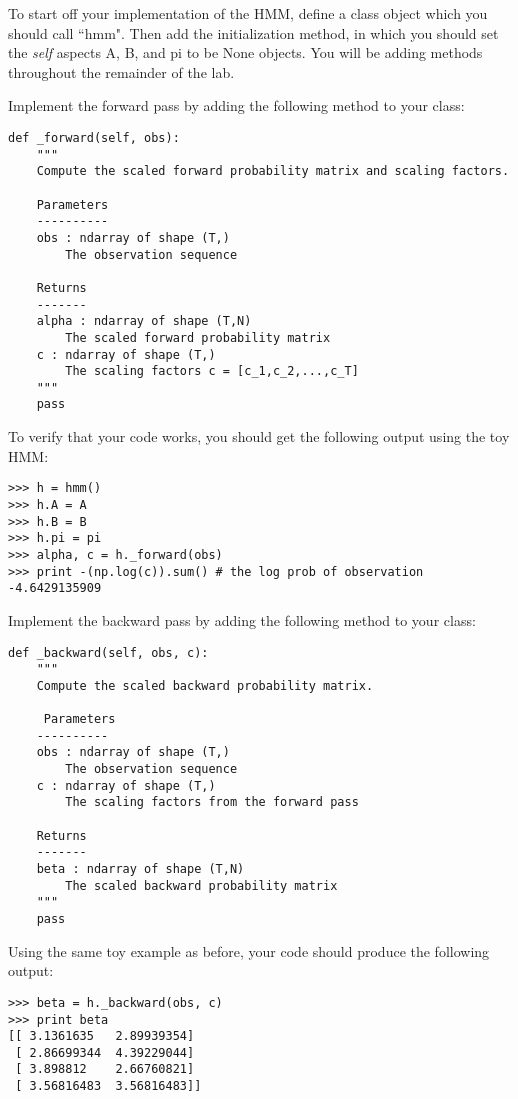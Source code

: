 
\begin{comment}
The following was listed as a problem, but gave the student nothing to do, so we removed the given code.

To start off your implementation of the HMM, define a class using the following code.
You will be adding class methods throughout the remainder of the lab.
\begin{lstlisting}
class hmm(object):
    """
    Finite state space hidden markov model.
    """
    def __init__(self):
        """
        Initialize model parameters.
        """
        self.A = None
        self.B = None
        self.pi = None
\end{lstlisting}
\end{comment}
To start off your implementation of the HMM, define a class object which you should call ``hmm".
Then add the initialization method, in which you should set the \emph{self} aspects A, B, and pi to be None objects.
You will be adding methods throughout the remainder of the lab.

Implement the forward pass by adding the following method to your class:
\begin{lstlisting}
def _forward(self, obs):
    """
    Compute the scaled forward probability matrix and scaling factors.

    Parameters
    ----------
    obs : ndarray of shape (T,)
        The observation sequence

    Returns
    -------
    alpha : ndarray of shape (T,N)
        The scaled forward probability matrix
    c : ndarray of shape (T,)
        The scaling factors c = [c_1,c_2,...,c_T]
    """
    pass
\end{lstlisting}
To verify that your code works, you should get the following output using the toy HMM:
\begin{lstlisting}
>>> h = hmm()
>>> h.A = A
>>> h.B = B
>>> h.pi = pi
>>> alpha, c = h._forward(obs)
>>> print -(np.log(c)).sum() # the log prob of observation
-4.6429135909
\end{lstlisting}

Implement the backward pass by adding the following method to your class:
\begin{lstlisting}
def _backward(self, obs, c):
    """
    Compute the scaled backward probability matrix.

     Parameters
    ----------
    obs : ndarray of shape (T,)
        The observation sequence
    c : ndarray of shape (T,)
        The scaling factors from the forward pass

    Returns
    -------
    beta : ndarray of shape (T,N)
        The scaled backward probability matrix
    """
    pass
\end{lstlisting}
Using the same toy example as before, your code should produce the following output:
\begin{lstlisting}
>>> beta = h._backward(obs, c)
>>> print beta
[[ 3.1361635   2.89939354]
 [ 2.86699344  4.39229044]
 [ 3.898812    2.66760821]
 [ 3.56816483  3.56816483]]
\end{lstlisting}

